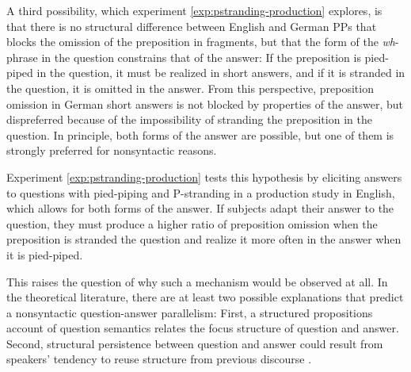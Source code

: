 A third possibility, which experiment \ref{exp:pstranding-production} explores, is that there is no structural difference between English and German PPs that blocks the omission of the preposition in fragments, but that the form of the \textit{wh}-phrase in the question constrains that of the answer: If the preposition is pied-piped in the question, it must be realized in short answers, and if it is stranded in the question, it is omitted in the answer. From this perspective, preposition omission in German short answers is not blocked by properties of the answer, but dispreferred because of the impossibility of stranding the preposition in the question. In principle, both forms of the answer are possible, but one of them is strongly preferred for nonsyntactic reasons.

Experiment \ref{exp:pstranding-production} tests this hypothesis by eliciting answers to questions with pied-piping and P-stranding in a production study in English, which allows for both forms of the answer. If subjects adapt their answer to the question, they must produce a higher ratio of preposition omission when the preposition is stranded the question and realize it more often in the answer when it is pied-piped.

This raises the question of why such a mechanism would be observed at all. In the theoretical literature, there are at least two possible explanations that predict a nonsyntactic question-answer parallelism: First, a structured propositions account of question semantics \citep{vonstechow1981, reich2002a} relates the focus structure of question and answer. Second, structural persistence \citep{nykiel2017} between question and answer could result from speakers' tendency to reuse structure from previous discourse \citep{levelt.kelter1982, nykiel2017}. 

\label{sec:psg-alternatives-structured}

